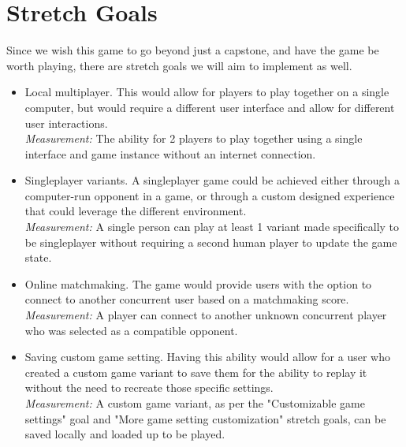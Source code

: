 \documentclass{article}
\begin{document}
\section{Stretch Goals}

Since we wish this game to go beyond just a capstone, and have the game be worth playing, there are stretch goals we will aim to implement as well.

\begin{itemize}
	\item Local multiplayer. This would allow for players to play together on a single computer, but would require a different user interface and allow for different user interactions.\\
	\textit{Measurement:} The ability for 2 players to play together using a single interface and game instance without an internet connection.
	
	\item Singleplayer variants. A singleplayer game could be achieved either through a computer-run opponent in a game, or through a custom designed experience that could leverage the different environment.\\
	\textit{Measurement:} A single person can play at least 1 variant made specifically to be singleplayer without requiring a second human player to update the game state.
	
	\item Online matchmaking. The game would provide users with the option to connect to another concurrent user based on a matchmaking score.\\
	\textit{Measurement:} A player can connect to another unknown concurrent player who was selected as a compatible opponent.
	
	\item Saving custom game setting. Having this ability would allow for a user who created a custom game variant to save them for the ability to replay it without the need to recreate those specific settings.\\
	\textit{Measurement:} A custom game variant, as per the "Customizable game settings" goal and "More game setting customization" stretch goals, can be saved locally and loaded up to be played.
	

\end{itemize}
\end{document}

